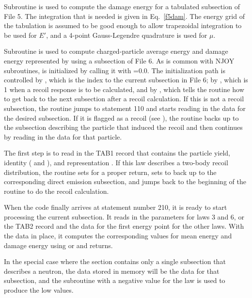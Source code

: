 Subroutine 
is used to compute the damage energy for a tabulated subsection
of File 5.  The integration that is needed is given in
Eq.~\ref{f5dam}.  The energy grid of the tabulation
is assumed to be good enough to allow trapezoidal
integration to be used for $E'$, and a 4-point Gauss-Legendre
quadrature is used for $\mu$.

Subroutine 
is used to compute charged-particle average energy and
damage energy represented by using a subsection of File 6.
As is common with NJOY subroutines,  is
initialized by calling it with =0.0.  The initialization
path is controlled by , which is the index
to the current subsection in File 6; by ,
which is 1 when a recoil response is to be calculated, and
by , which tells the routine how to get back to
the next subsection after a recoil calculation.  If this is
not a recoil subsection, the routine jumps to statement 110
and starts reading in the data for the desired subsection.
If it is flagged as a recoil (see ), the routine
backs up to the subsection describing the particle that induced
the recoil and then continues by reading in the data for that
particle.

The first step is to read in the TAB1 record
that contains the particle yield, identity (
and ), and representation .
If this law describes a two-body recoil distribution, the
routine sets  for a proper return, sets
 to back up to the corresponding direct emission
subsection, and jumps back to the beginning of the routine
to do the recoil calculation.

When the code finally arrives at statement number 210, it is
ready to start processing the current subsection.  It reads
in the parameters for laws 3 and 6, or the TAB2 record and
the data for the first energy point for the other laws.  With
the data in place, it computes the corresponding values
for mean energy and damage energy using
 or
 and returns.

In the special case where the section contains only a single
subsection that describes a neutron, the data stored in
memory will be the data for that subsection, and the
subroutine  with a
negative value for the law is used to produce the low values.

